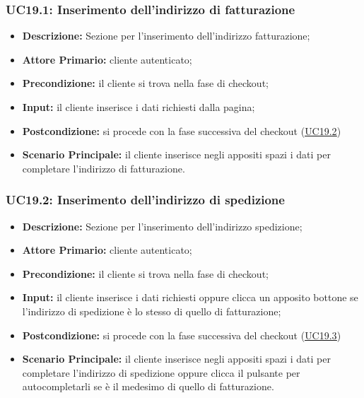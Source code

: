 \subsubsection{UC19.1: Inserimento dell'indirizzo di fatturazione}
\label{sec:UC19.1}
\begin{itemize}
    \item \textbf{Descrizione:} Sezione per l'inserimento dell'indirizzo fatturazione;
    \item \textbf{Attore Primario:} cliente autenticato;
    \item \textbf{Precondizione:} il cliente si trova nella fase di checkout;
    \item \textbf{Input:} il cliente inserisce i dati richiesti dalla pagina;
    \item \textbf{Postcondizione:} si procede con la fase successiva del checkout (\hyperref[sec:UC19.2]{\underline{UC19.2}})
    \item \textbf{Scenario Principale:} il cliente inserisce negli appositi spazi i dati per completare l'indirizzo di fatturazione.
\end{itemize}
\subsubsection{UC19.2: Inserimento dell'indirizzo di spedizione}
\label{sec:UC19.2}
\begin{itemize}
    \item \textbf{Descrizione:} Sezione per l'inserimento dell'indirizzo spedizione;
    \item \textbf{Attore Primario:} cliente autenticato;
    \item \textbf{Precondizione:} il cliente si trova nella fase di checkout;
    \item \textbf{Input:} il cliente inserisce i dati richiesti oppure clicca un apposito bottone se l'indirizzo di spedizione è lo stesso di quello di fatturazione;
    \item \textbf{Postcondizione:} si procede con la fase successiva del checkout (\hyperref[sec:UC19.3]{\underline{UC19.3}})
    \item \textbf{Scenario Principale:} il cliente inserisce negli appositi spazi i dati per completare l'indirizzo di spedizione oppure clicca il pulsante per autocompletarli se è il medesimo di quello di fatturazione.
\end{itemize}
